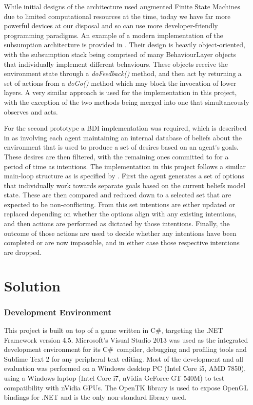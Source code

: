 \documentclass[a4paper,12pt]{article}
\newcommand{\Csh}{C{\lserif\#}}
\begin{document}
While initial designs of the architecture used augmented Finite State Machines \cite{brooks86} due to limited computational resources at the time, today we have far more powerful devices at our disposal and so can use more developer-friendly programming paradigms. An example of a modern implementation of the subsumption architecture is provided in . Their design is heavily object-oriented, with the subsumption stack being comprised of many BehaviourLayer objects that individually implement different behaviours. These objects receive the environment state through a \emph{doFeedback()} method, and then act by returning a set of actions from a \emph{doGo()} method which may block the invocation of lower layers. A very similar approach is used for the implementation in this project, with the exception of the two methods being merged into one that simultaneously observes and acts.

For the second prototype a BDI implementation was required, which is described in  as involving each agent maintaining an internal database of beliefs about the environment that is used to produce a set of desires based on an agent's goals. These desires are then filtered, with the remaining ones committed to for a period of time as intentions. The implementation in this project follows a similar main-loop structure as is specified by . First the agent generates a set of options that individually work towards separate goals based on the current beliefs model state. These are then compared and reduced down to a selected set that are expected to be non-conflicting. From this set intentions are either updated or replaced depending on whether the options align with any existing intentions, and then actions are performed as dictated by those intentions. Finally, the outcome of those actions are used to decide whether any intentions have been completed or are now impossible, and in either case those respective intentions are dropped.

\section{Solution}
\subsubsection{Development Environment}\noindent
This project is built on top of a game written in \Csh, targeting the .NET Framework version 4.5. Microsoft's Visual Studio 2013 was used as the integrated development environment for its \Csh~compiler, debugging and profiling tools and Sublime Text 2 for any peripheral text editing. Most of the development and all evaluation was performed on a Windows desktop PC (Intel Core i5, AMD 7850), using a Windows laptop (Intel Core i7, nVidia GeForce GT 540M) to test compatibility with nVidia GPUs. The OpenTK library is used to expose OpenGL bindings for .NET and is the only non-standard library used.
\end{document}
